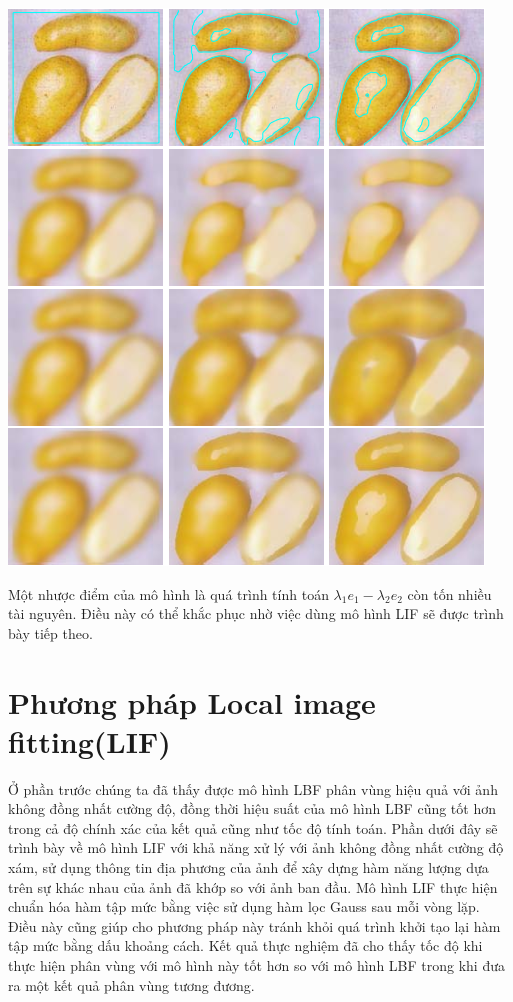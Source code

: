 \documentclass[12pt, oneside, a4paper]{book}
\begin{document}
\begin{center}
\includegraphics[]{figure/denoise.png}
\end{center}

Một nhược điểm của mô hình là quá trình  tính toán $\lambda_1 e_1 -\lambda_2 e_2$ còn tốn nhiều tài nguyên. Điều này có thể khắc phục nhờ việc dùng mô hình LIF sẽ được trình bày tiếp theo.
\section{Phương pháp Local image fitting(LIF)}
Ở phần trước chúng ta đã thấy được mô hình LBF phân vùng hiệu quả với ảnh không đồng nhất cường độ, đồng thời hiệu suất của mô hình LBF cũng tốt hơn trong cả độ chính xác của kết quả cũng như tốc độ tính toán. Phần dưới đây sẽ trình bày về mô hình LIF với khả năng xử lý với ảnh không đồng nhất cường độ xám, sử dụng thông tin địa phương của ảnh để xây dựng hàm năng lượng dựa trên sự khác nhau của ảnh đã khớp so với ảnh ban đầu. Mô hình LIF thực hiện chuẩn hóa hàm tập mức bằng việc sử dụng hàm lọc Gauss sau mỗi vòng lặp. Điều này cũng giúp cho phương pháp này tránh khỏi quá trình khởi tạo lại hàm tập mức bằng dấu khoảng cách. Kết quả thực nghiệm đã cho thấy tốc độ khi thực hiện phân vùng với mô hình này tốt hơn so với mô hình LBF trong khi đưa ra một kết quả phân vùng tương đương.
\end{document}
